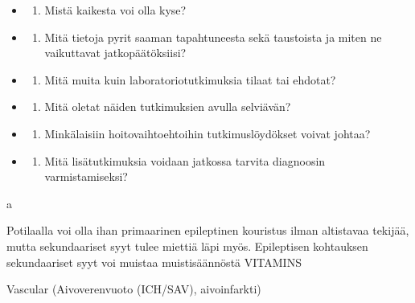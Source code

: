 \documentclass[
]{book}
\providecommand{\tightlist}{%
  \setlength{\itemsep}{0pt}\setlength{\parskip}{0pt}}
\begin{document}
\begin{itemize}
\tightlist
\item
  \begin{enumerate}
  \def\labelenumi{\alph{enumi}.}
  \tightlist
  \item
    Mistä kaikesta voi olla kyse?
  \end{enumerate}
\item
  \begin{enumerate}
  \def\labelenumi{\alph{enumi}.}
  \setcounter{enumi}{1}
  \tightlist
  \item
    Mitä tietoja pyrit saaman tapahtuneesta sekä taustoista ja miten ne vaikuttavat jatkopäätöksiisi?
  \end{enumerate}
\item
  \begin{enumerate}
  \def\labelenumi{\alph{enumi}.}
  \setcounter{enumi}{2}
  \tightlist
  \item
    Mitä muita kuin laboratoriotutkimuksia tilaat tai ehdotat?
  \end{enumerate}
\item
  \begin{enumerate}
  \def\labelenumi{\alph{enumi}.}
  \setcounter{enumi}{3}
  \tightlist
  \item
    Mitä oletat näiden tutkimuksien avulla selviävän?
  \end{enumerate}
\item
  \begin{enumerate}
  \def\labelenumi{\alph{enumi}.}
  \setcounter{enumi}{4}
  \tightlist
  \item
    Minkälaisiin hoitovaihtoehtoihin tutkimuslöydökset voivat johtaa?
  \end{enumerate}
\item
  \begin{enumerate}
  \def\labelenumi{\alph{enumi}.}
  \setcounter{enumi}{5}
  \tightlist
  \item
    Mitä lisätutkimuksia voidaan jatkossa tarvita diagnoosin varmistamiseksi?
  \end{enumerate}
\end{itemize}

a

Potilaalla voi olla ihan primaarinen epileptinen kouristus ilman altistavaa tekijää, mutta sekundaariset syyt tulee miettiä läpi myös. Epileptisen kohtauksen sekundaariset syyt voi muistaa muistisäännöstä VITAMINS

Vascular (Aivoverenvuoto (ICH/SAV), aivoinfarkti)
\end{document}
